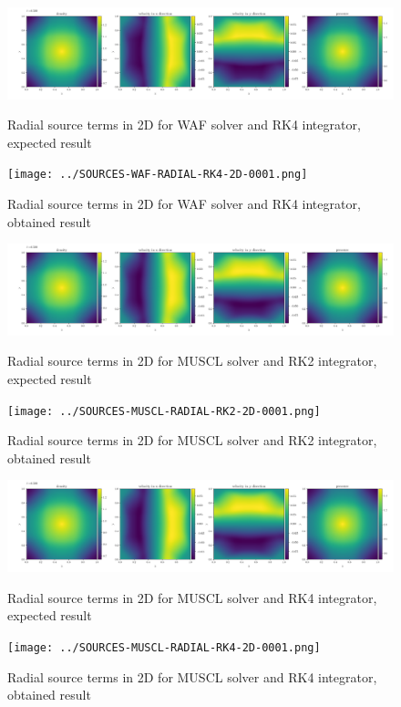     \begin{figure}[htbp]
        \centering
        \includegraphics[width=.9\textwidth]{./figures/SOURCES-WAF-RADIAL-RK4-2D-0001.png}%
        \caption{Radial source terms in 2D for WAF solver and RK4 integrator, expected result}
        \texttt{[image: ../SOURCES-WAF-RADIAL-RK4-2D-0001.png]}%
        \caption{Radial source terms in 2D for WAF solver and RK4 integrator, obtained result}
    \end{figure}



    \begin{figure}[htbp]
        \centering
        \includegraphics[width=.9\textwidth]{./figures/SOURCES-MUSCL-RADIAL-RK2-2D-0001.png}%
        \caption{Radial source terms in 2D for MUSCL solver and RK2 integrator, expected result}
        \texttt{[image: ../SOURCES-MUSCL-RADIAL-RK2-2D-0001.png]}%
        \caption{Radial source terms in 2D for MUSCL solver and RK2 integrator, obtained result}
    \end{figure}

    \begin{figure}[htbp]
        \centering
        \includegraphics[width=.9\textwidth]{./figures/SOURCES-MUSCL-RADIAL-RK4-2D-0001.png}%
        \caption{Radial source terms in 2D for MUSCL solver and RK4 integrator, expected result}
        \texttt{[image: ../SOURCES-MUSCL-RADIAL-RK4-2D-0001.png]}%
        \caption{Radial source terms in 2D for MUSCL solver and RK4 integrator, obtained result}
    \end{figure}








